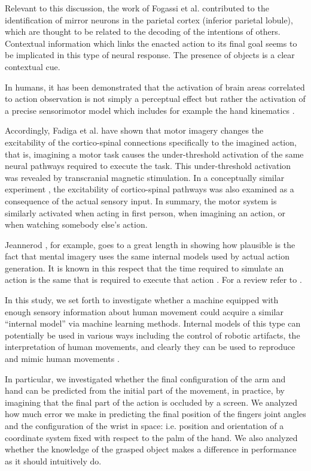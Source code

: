 Relevant to this discussion, the work of Fogassi et
al. \cite{fogassi-05} contributed to the identification of mirror
neurons in the parietal cortex (inferior parietal lobule), which are
thought to be related to the decoding of the intentions of
others. Contextual information which links the enacted action to its
final goal seems to be implicated in this type of neural response. The
presence of objects is a clear contextual cue.

In humans, it has been demonstrated that the activation of brain areas
correlated to action observation is not simply a perceptual effect but
rather the activation of a precise sensorimotor model which includes
for example the hand kinematics \cite{pozzo-06}.
 
Accordingly, Fadiga et al. \cite{fadiga-99,vargas-04} have shown that
motor imagery changes the excitability of the cortico-spinal
connections specifically to the imagined action, that is, imagining a
motor task causes the under-threshold activation of the same neural
pathways required to execute the task. This under-threshold activation
was revealed by transcranial magnetic stimulation. In a conceptually
similar experiment \cite{fadiga-05}, the excitability of
cortico-spinal pathways was also examined as a consequence of the
actual sensory input. In summary, the motor system is similarly
activated when acting in first person, when imagining an action, or
when watching somebody else's action.


Jeannerod \cite{jeannerod-88}, for example, goes to a great length in
showing how plausible is the fact that mental imagery uses the same
internal models used by actual action generation.  It is known in this
respect that the time required to simulate an action is the same that
is required to execute that action \cite{sirigu-96}. For a review
refer to \cite{jeannerod-99}.

In this study, we set forth to investigate whether a machine equipped
with enough sensory information about human movement could acquire a
similar ``internal model'' via machine learning methods. Internal
models of this type can potentially be used in various ways including
the control of robotic artifacts, the interpretation of human
movements, and clearly they can be used to reproduce and mimic human
movements \cite{wolpert-01}.

In particular, we investigated whether the final configuration of the
arm and hand can be predicted from the initial part of the movement,
in practice, by imagining that the final part of the action is
occluded by a screen. We analyzed how much error we make in predicting
the final position of the fingers joint angles and the configuration
of the wrist in space: i.e. position and orientation of a coordinate
system fixed with respect to the palm of the hand. We also analyzed
whether the knowledge of the grasped object makes a difference in
performance as it should intuitively do.

